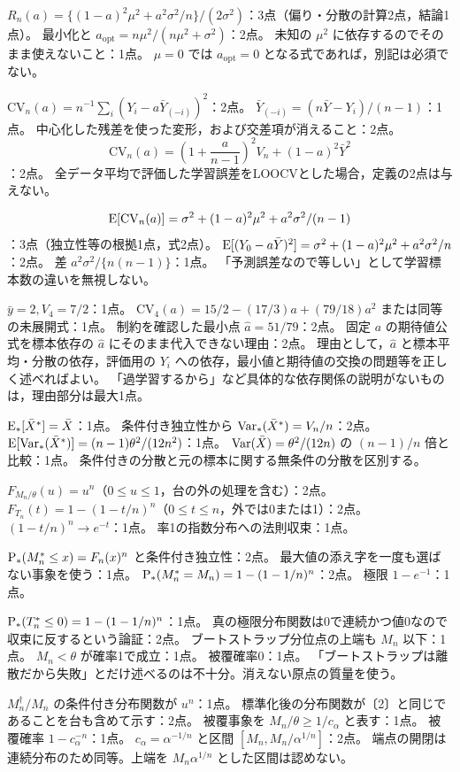 \documentclass[a4paper,11pt]{ltjsarticle}
\begin{document}
$R_n(a)=\{(1-a)^2\mu^2+a^2\sigma^2/n\}/(2\sigma^2)$：3点（偏り・分散の計算2点，結論1点）。
最小化と $a_{\mathrm{opt}}=n\mu^2/(n\mu^2+\sigma^2)$：2点。
未知の $\mu^2$ に依存するのでそのまま使えないこと：1点。
$\mu=0$ では $a_{\mathrm{opt}}=0$ となる式であれば，別記は必須でない。

$\mathrm{CV}_n(a)=n^{-1}\sum_i(Y_i-a\bar Y_{(-i)})^2$：2点。
$\bar Y_{(-i)}=(n\bar Y-Y_i)/(n-1)$：1点。
中心化した残差を使った変形，および交差項が消えること：2点。
\[
\mathrm{CV}_n(a)=\left(1+\frac a{n-1}\right)^2V_n+(1-a)^2\bar Y^2
\]
：2点。
全データ平均で評価した学習誤差をLOOCVとした場合，定義の2点は与えない。

\[
\operatorname{E}[\mathrm{CV}_n(a)]=\sigma^2+(1-a)^2\mu^2+a^2\sigma^2/(n-1)
\]
：3点（独立性等の根拠1点，式2点）。
$\operatorname{E}[(Y_0-a\bar Y)^2]=\sigma^2+(1-a)^2\mu^2+a^2\sigma^2/n$：2点。
差 $a^2\sigma^2/\{n(n-1)\}$：1点。
「予測誤差なので等しい」として学習標本数の違いを無視しない。

$\bar y=2,V_4=7/2$：1点。
$\mathrm{CV}_4(a)=15/2-(17/3)a+(79/18)a^2$ または同等の未展開式：1点。
制約を確認した最小点 $\hat a=51/79$：2点。
固定 $a$ の期待値公式を標本依存の $\hat a$ にそのまま代入できない理由：2点。
理由として，$\hat a$ と標本平均・分散の依存，評価用の $Y_i$ への依存，最小値と期待値の交換の問題等を正しく述べればよい。
「過学習するから」など具体的な依存関係の説明がないものは，理由部分は最大1点。
\newpage

$\operatorname{E}_*[\bar X^*]=\bar X$：1点。
条件付き独立性から $\operatorname{Var}_*(\bar X^*)=V_n/n$：2点。
$\operatorname{E}[\operatorname{Var}_*(\bar X^*)]=(n-1)\theta^2/(12n^2)$：1点。
$\operatorname{Var}(\bar X)=\theta^2/(12n)$ の $(n-1)/n$ 倍と比較：1点。
条件付きの分散と元の標本に関する無条件の分散を区別する。

$F_{M_n/\theta}(u)=u^n$（$0\leq u\leq1$，台の外の処理を含む）：2点。
$F_{T_n}(t)=1-(1-t/n)^n$（$0\leq t\leq n$，外では0または1）：2点。
$(1-t/n)^n\to e^{-t}$：1点。
率1の指数分布への法則収束：1点。

$\operatorname{P}_*(M_n^*\leq x)=F_n(x)^n$ と条件付き独立性：2点。
最大値の添え字を一度も選ばない事象を使う：1点。
$\operatorname{P}_*(M_n^*=M_n)=1-(1-1/n)^n$：2点。
極限 $1-e^{-1}$：1点。

$\operatorname{P}_*(T_n^*\leq0)=1-(1-1/n)^n$：1点。
真の極限分布関数は0で連続かつ値0なので収束に反するという論証：2点。
ブートストラップ分位点の上端も $M_n$ 以下：1点。
$M_n<\theta$ が確率1で成立：1点。
被覆確率0：1点。
「ブートストラップは離散だから失敗」とだけ述べるのは不十分。消えない原点の質量を使う。

$M_n^\dagger/M_n$ の条件付き分布関数が $u^n$：1点。
標準化後の分布関数が〔2〕と同じであることを台も含めて示す：2点。
被覆事象を $M_n/\theta\geq1/c_\alpha$ と表す：1点。
被覆確率 $1-c_\alpha^{-n}$：1点。
$c_\alpha=\alpha^{-1/n}$ と区間 $[M_n,M_n/\alpha^{1/n}]$：2点。
端点の開閉は連続分布のため同等。上端を $M_n\alpha^{1/n}$ とした区間は認めない。
\end{document}
